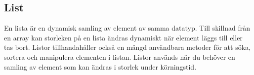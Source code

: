 \hypertarget{cb1}{}
\begin{Shaded}
\begin{Highlighting}[]
\OperatorTok{[]}\OperatorTok{=}  \OperatorTok{[}\OperatorTok{];}
\OperatorTok{[}\OperatorTok{]} \OperatorTok{=} \OperatorTok{;}
\OperatorTok{[}\OperatorTok{]} \OperatorTok{=} \OperatorTok{;}
\OperatorTok{[}\OperatorTok{]} \OperatorTok{=} \OperatorTok{;}
\OperatorTok{(}\OperatorTok{[}\OperatorTok{]);}  
\end{Highlighting}
\end{Shaded}

\hypertarget{list}{%
\subsection{List}\label{list}}

En lista är en dynamisk samling av element av samma datatyp. Till
skillnad från en array kan storleken på en lista ändras dynamiskt när
element läggs till eller tas bort. Listor tillhandahåller också en mängd
användbara metoder för att söka, sortera och manipulera elementen i
listan. Listor används när du behöver en samling av element som kan
ändras i storlek under körningstid.

\hypertarget{cb2}{}
\begin{Shaded}
\begin{Highlighting}[]
\OperatorTok{\textless{}}\OperatorTok{\textgreater{}}\OperatorTok{=}  \OperatorTok{\textless{}\textgreater{}(}\OperatorTok{(}\OperatorTok{,} \OperatorTok{,} \OperatorTok{,} \OperatorTok{,} \OperatorTok{));}
\OperatorTok{(}\OperatorTok{);}
\OperatorTok{(}\OperatorTok{());}  
\end{Highlighting}
\end{Shaded}

